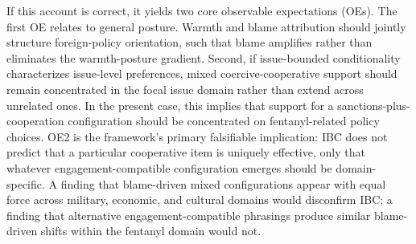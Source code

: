 \documentclass[12pt,letterpaper]{article}
\begin{document}
If this account is correct, it yields two core observable expectations (OEs). The first OE relates to general posture. Warmth and blame attribution should jointly structure foreign-policy orientation, such that blame amplifies rather than eliminates the warmth-posture gradient. Second, if issue-bounded conditionality characterizes issue-level preferences, mixed coercive-cooperative support should remain concentrated in the focal issue domain rather than extend across unrelated ones. In the present case, this implies that support for a sanctions-plus-cooperation configuration should be concentrated on fentanyl-related policy choices. OE2 is the framework's primary falsifiable implication: IBC does not predict that a particular cooperative item is uniquely effective, only that whatever engagement-compatible configuration emerges should be domain-specific. A finding that blame-driven mixed configurations appear with equal force across military, economic, and cultural domains would disconfirm IBC; a finding that alternative engagement-compatible phrasings produce similar blame-driven shifts within the fentanyl domain would not. 



\end{document}
